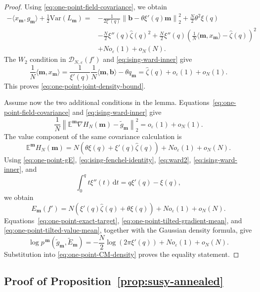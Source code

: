 \documentclass[a4paper,10pt,reqno]{amsart}
\numberwithin{equation}{section}
\newcommand{\ve}{\varepsilon}
\newcommand{\dE}{\mathbb{E}}%
\newcommand{\Var}{\mathrm{Var}}%
\newcommand{\dd}{\mathrm{d}}
\newcommand{\bfm}{\mathbf{m}}
\newcommand{\bfb}{\mathbf{b}}
\begin{document}
\begin{proof}
		Using \eqref{eq:one-point-field-covariance}, we obtain
		\begin{align*}
			-\langle x_\bfm,g_\bfm\rangle
			+\frac12\Var(L_\bfm)
			={}&
			-\frac1{2\xi'(q)}
			\left\|\bfb-\theta\xi'(q)\bfm\right\|_2^2
			+\frac N2\theta^2\xi(q)\\
			&-\frac N2\xi''(q)\widehat\zeta(q)^2
			+\frac N2\xi''(q)
			\left(
			\frac1N\langle\bfm,x_\bfm\rangle
			-\widehat\zeta(q)
			\right)^2\\
			&+N o_\ve(1)+o_N(N).
		\end{align*}
		The \(W_2\) condition in \(\mathcal D_{N,\ve}(f')\) and
		\eqref{eq:ising-ward-inner} give
		\[
		\frac1N\langle\bfm,x_\bfm\rangle
		=
		\frac1{\xi'(q)}
		\frac1N\langle\bfm,\bfb\rangle
		-\theta q_\bfm
		=
		\widehat\zeta(q)+o_\ve(1)+o_N(1).
		\]
		This proves \eqref{eq:one-point-joint-density-bound}.
		
		Assume now the two additional conditions in the lemma.
		Equations~\eqref{eq:one-point-field-covariance} and
		\eqref{eq:ising-ward-inner} give
		\begin{equation}\label{eq:one-point-tilted-gradient-mean}
			\frac1N
			\left\|
			\dE^\bfm\nabla H_N(\bfm)-\widetilde g_\bfm
			\right\|_2^2
			=o_\ve(1)+o_N(1).
		\end{equation}
		The value component of the same covariance calculation is
		\begin{equation}\label{eq:one-point-tilted-value-mean}
			\dE^\bfm H_N(\bfm)
			=
			N\left(
			\theta\xi(q)+\xi'(q)\widehat\zeta(q)
			\right)
			+N o_\ve(1)+o_N(N).
		\end{equation}
		Using \eqref{eq:one-point-gE},
		\eqref{eq:ising-fenchel-identity}, \eqref{eq:ward2},
		\eqref{eq:ising-ward-inner}, and
		\[
		\int_0^q t\xi''(t)\,\dd t
		=q\xi'(q)-\xi(q),
		\]
		we obtain
		\[
		E_\bfm(f')
		=
		N\left(
		\xi'(q)\widehat\zeta(q)+\theta\xi(q)
		\right)
		+N o_\ve(1)+o_N(N).
		\]
		Equations~\eqref{eq:one-point-exact-target},
		\eqref{eq:one-point-tilted-gradient-mean}, and
		\eqref{eq:one-point-tilted-value-mean}, together with the Gaussian
		density formula, give
		\[
		\log p^{\,\bfm}
		(\widetilde g_\bfm,\widetilde E_\bfm)
		=
		-\frac N2\log(2\pi\xi'(q))
		+N o_\ve(1)+o_N(N).
		\]
		Substitution into \eqref{eq:one-point-CM-density} proves the equality
		statement.
	\end{proof}
	
	\subsection{Proof of Proposition~\ref{prop:susy-annealed}}
	
\end{document}
